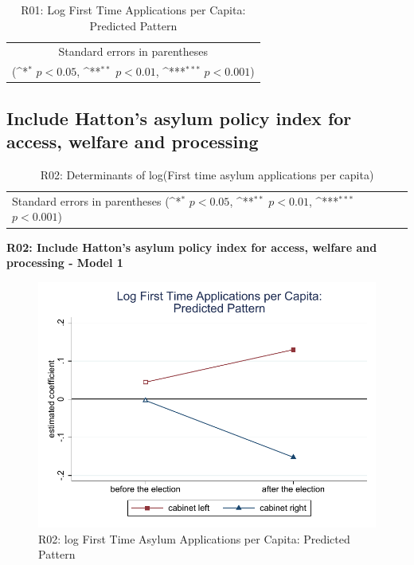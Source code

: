 \documentclass[10pt,a4paper]{scrartcl}
\begin{document}
\begin{table}[!ht]\centering
	\footnotesize
	\renewcommand{\arraystretch}{1.2}
	\def\sym#1{\ifmmode^{#1}\else\(^{#1}\)\fi}
	\caption{R01: Log First Time Applications per Capita: Predicted Pattern}
	\begin{tabular}{l*{2}{c}}
		\hline\hline
		
		\hline\hline
		\multicolumn{3}{c}{\footnotesize Standard errors in parentheses} \\
		\multicolumn{3}{c}{\footnotesize (\sym{*} \(p<0.05\), \sym{**} \(p<0.01\), \sym{***} \(p<0.001\))} \\
	\end{tabular}
\end{table}




\clearpage
\FloatBarrier
\subsection{Include Hatton's asylum policy index for access, welfare and processing}
\begin{table}[!ht]\centering
	\renewcommand{\arraystretch}{1.25}
	\small
	\def\sym#1{\ifmmode^{#1}\else\(^{#1}\)\fi}
	\caption{R02: Determinants of log(First time asylum applications per capita)}
	\begin{tabular}{l*{3}{c}}
		\hline\hline
		
		\hline\hline
		\multicolumn{4}{l}{\footnotesize Standard errors in parentheses (\sym{*} \(p<0.05\), \sym{**} \(p<0.01\), \sym{***} \(p<0.001\))}\\
	\end{tabular}
\end{table}

\clearpage
\textbf{R02: Include Hatton's asylum policy index for access, welfare and processing - Model 1}
\begin{figure}[!ht]
	\centering
	\includegraphics[width=1\textwidth]{figures_edited/app_graph1_R02.pdf}
	\caption{R02: log First Time Asylum Applications per Capita: Predicted Pattern}
\end{figure}
\end{document}
